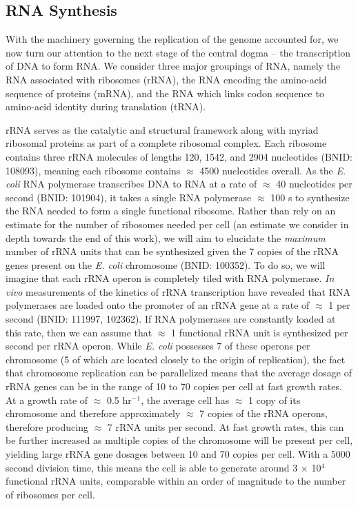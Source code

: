 \subsection{RNA Synthesis}\label{sec:RNA_synthesis}
With the machinery governing the replication of the genome accounted for, we
now turn our attention to the next stage of the central dogma -- the
transcription of DNA to form RNA. We consider three major groupings
of RNA, namely the RNA associated with ribosomes (rRNA), the RNA encoding the
amino-acid sequence of proteins (mRNA), and the RNA which links codon
sequence to amino-acid identity during translation (tRNA).

rRNA serves as the catalytic and structural
framework along with myriad ribosomal proteins as part of a complete ribosomal complex.
Each ribosome contains three rRNA molecules of lengths 120, 1542,
and 2904 nucleotides (BNID: 108093), meaning each ribosome
contains $\approx$ 4500 nucleotides overall. As the \textit{E. coli} RNA polymerase
transcribes DNA to RNA at a rate of $\approx$ 40 nucleotides per second
(BNID: 101904), it takes a single RNA polymerase
$\approx$ 100 s to synthesize the RNA needed to form a single functional ribosome.
Rather than rely on an estimate for the number of ribosomes needed per cell
(an estimate we consider in depth towards the end of this work), we will aim
to elucidate the \textit{maximum} number of rRNA units that can
be synthesized given the 7 copies of the rRNA genes present on the \textit{E.
coli} chromosome (BNID: 100352). To do so, we will imagine that each rRNA operon is completely
tiled with RNA polymerase. 
\textit{In vivo} measurements of the kinetics of rRNA transcription have revealed that
RNA polymerases are loaded onto the promoter of an rRNA gene at a rate of
$\approx$ 1 per second (BNID: 111997, 102362). If RNA
polymerases are constantly loaded at this rate,
then we can assume that $\approx$ 1 functional rRNA unit is
synthesized per second per rRNA operon. While \textit{E. coli} possesses 7
of these operons per chromosome (5 of which are located closely to the origin of
replication), the fact that chromosome
replication can be parallelized means that the average dosage of rRNA genes can
be in the range of 10 to 70 copies per cell at fast growth rates. At a growth
rate of $\approx$ 0.5 hr$^{-1}$, the average cell has $\approx$ 1 copy of its
chromosome and therefore approximately $\approx$ 7 copies of the rRNA operons,
therefore producing $\approx$ 7 rRNA units per second. 
At fast growth rates, this can be
further increased as multiple copies of the chromosome will be present per cell,
yielding large rRNA gene dosages between 10 and 70 copies per cell.
With a 5000 second division time, this means the cell is able to generate around 3 $\times$ 10$^4$ functional rRNA units,
comparable within an order of magnitude to the number of ribosomes per cell.



